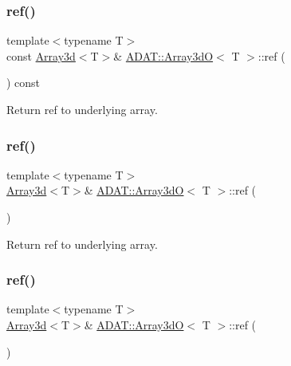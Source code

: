 \subsubsection{\texorpdfstring{ref()}{ref()}\hspace{0.1cm}{\footnotesize\ttfamily [3/6]}}
{\footnotesize\ttfamily template$<$typename T$>$ \\
const \mbox{\hyperlink{classXMLArray_1_1Array3d}{Array3d}}$<$T$>$\& \mbox{\hyperlink{classADAT_1_1Array3dO}{A\+D\+A\+T\+::\+Array3dO}}$<$ T $>$\+::ref (\begin{DoxyParamCaption}{ }\end{DoxyParamCaption}) const\hspace{0.3cm}{\ttfamily [inline]}}



Return ref to underlying array. 

\mbox{\label{classADAT_1_1Array3dO_ad56a8ea2aac56eba9b8b74af06e79970}} 
\subsubsection{\texorpdfstring{ref()}{ref()}\hspace{0.1cm}{\footnotesize\ttfamily [4/6]}}
{\footnotesize\ttfamily template$<$typename T$>$ \\
\mbox{\hyperlink{classXMLArray_1_1Array3d}{Array3d}}$<$T$>$\& \mbox{\hyperlink{classADAT_1_1Array3dO}{A\+D\+A\+T\+::\+Array3dO}}$<$ T $>$\+::ref (\begin{DoxyParamCaption}{ }\end{DoxyParamCaption})\hspace{0.3cm}{\ttfamily [inline]}}



Return ref to underlying array. 

\mbox{\label{classADAT_1_1Array3dO_ad56a8ea2aac56eba9b8b74af06e79970}} 
\subsubsection{\texorpdfstring{ref()}{ref()}\hspace{0.1cm}{\footnotesize\ttfamily [5/6]}}
{\footnotesize\ttfamily template$<$typename T$>$ \\
\mbox{\hyperlink{classXMLArray_1_1Array3d}{Array3d}}$<$T$>$\& \mbox{\hyperlink{classADAT_1_1Array3dO}{A\+D\+A\+T\+::\+Array3dO}}$<$ T $>$\+::ref (\begin{DoxyParamCaption}{ }\end{DoxyParamCaption})\hspace{0.3cm}{\ttfamily [inline]}}



